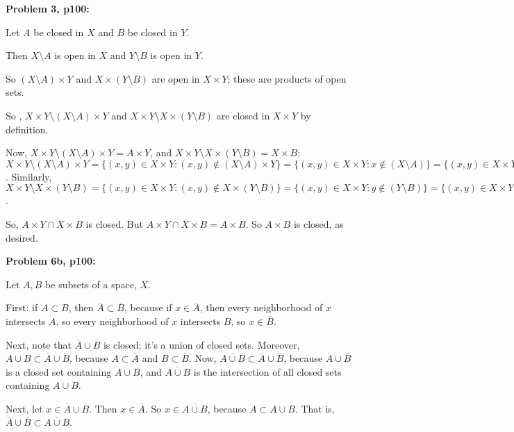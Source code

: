 \documentclass[a4paper,12pt]{article}
\begin{document}
{\bf Problem 3, p100:}

Let $A$ be closed in $X$ and $B$ be closed in $Y$.

Then $X \setminus A$ is open in $X$ and $Y \setminus B$ is open in $Y$.

So  $(X \setminus A) \times Y$ and $X \times (Y \setminus B)$ are open in $X \times Y$; these are products of open sets.

So , $X \times Y \setminus (X \setminus A) \times Y$ and $X \times Y \setminus X \times (Y \setminus B)$ are closed in $X \times Y$ by definition.

Now, $X \times Y \setminus (X \setminus A) \times Y = A \times Y$, and $X \times Y \setminus X \times (Y \setminus B) = X \times B$; $X \times Y \setminus (X \setminus A) \times Y = \{(x,y) \in X \times Y: (x,y) \notin (X \setminus A) \times Y\} = \{(x,y) \in X \times Y: x \notin (X \setminus A) \} = \{(x,y) \in X \times Y: x \in A \} = A \times Y$. Similarly, $X \times Y \setminus X \times (Y \setminus B) = \{(x,y) \in X \times Y: (x,y) \notin X \times (Y \setminus B)\} = \{(x,y) \in X \times Y: y \notin (Y \setminus B) \} = \{(x,y) \in X \times Y: y \in B \} = X \times B$.

So,  $A \times Y \cap X \times B$ is closed. But $A \times Y \cap X \times B = A \times B$. So $A \times B$ is closed, as desired.

\shunt

{\bf Problem 6b, p100:}

Let $A, B$ be subsets of a space, $X$.

First: if $A \subset B$, then $\overline{A} \subset \overline{B}$, because if $x \in \overline{A}$, then every neighborhood of $x$ intersects $A$, so every neighborhood of $x$ intersects $B$, so $x \in \overline{B}$. 

Next, note that $\overline{A} \cup \overline{B}$ is closed; it's a union of closed sets. Moreover, $A \cup B \subset \overline{A} \cup \overline{B}$, because $A \subset \overline{A}$ and $B \subset \overline{B}$. Now, $\overline{A \cup B} \subset \overline{A} \cup \overline{B}$, because $\overline{A} \cup \overline{B}$ is a closed set containing $A \cup B$, and $\overline{A \cup B}$ is the intersection of all closed sets containing $A \cup B$.

Next, let $x \in \overline{A} \cup \overline{B}$. Then $x \in \overline{A}$. So $x \in \overline{A \cup B}$, because $A \subset A \cup B$. That is, $\overline{A} \cup \overline{B} \subset \overline{A \cup B}$. 
\end{document}
